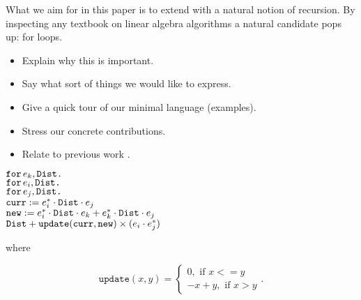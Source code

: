 What we aim for in this paper is to extend \lang with a natural notion of recursion. By inspecting any textbook on linear algebra algorithms a natural candidate pops up: for loops.


\begin{itemize}
\item Explain why this is important.
\item Say what sort of things we would like to express.
\item Give a quick tour of our minimal language (examples).
\item Stress our concrete contributions.
\item Relate to previous work \cite{matlang,BrijderGBW19,Geerts19,HutchisonHS17}.
\end{itemize}


\noindent
$\texttt{for}\, e_k,\texttt{Dist} \texttt{.}\, $
\\
\hspace*{0.5cm} $\texttt{for}\, e_i,\texttt{Dist} \texttt{.}\, $
\\
\hspace*{1cm} $\texttt{for}\, e_j,\texttt{Dist} \texttt{.}\, $
\\
\hspace*{1.5cm} 
$\texttt{curr} := e_i^*\cdot \texttt{Dist} \cdot e_j$\\
\hspace*{1.5cm} 
$\texttt{new} := e_i^*\cdot \texttt{Dist} \cdot e_k + e_k^*\cdot \texttt{Dist}\cdot e_j$\\
\hspace*{1.5cm}
$\texttt{Dist} + \texttt{update}(\texttt{curr},\texttt{new})\times (e_i\cdot e_j^*)$

where

\[
  			\texttt{update}(x,y)=\begin{cases}
               0, \text{ if } x<=y \\
               -x + y, \text{ if } x > y
            \end{cases}.
		\]
